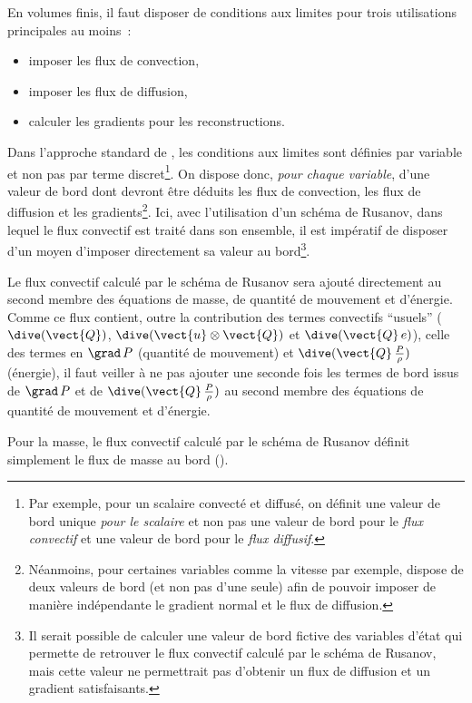 En volumes finis, il faut disposer de conditions aux
limites pour trois utilisations principales au moins~:
         \begin{itemize}
        \item imposer les flux de convection,
        \item imposer les flux de diffusion,
        \item calculer les gradients pour les reconstructions.
        \end{itemize}
Dans l'approche standard de \CS, les conditions aux limites sont d\'efinies par
variable et non pas par terme discret\footnote{Par exemple, pour un scalaire
convect\'e et diffus\'e, on d\'efinit une valeur de bord unique {\it pour le scalaire}
et non pas une valeur de bord pour le {\it flux convectif} et une valeur de bord
pour le {\it flux diffusif}.}. On dispose donc, {\it pour chaque variable},
d'une valeur de bord dont devront \^etre d\'eduits les flux de
convection, les flux de diffusion et les gradients\footnote{N\'eanmoins, pour
certaines variables comme la vitesse par exemple, \CS dispose de deux valeurs
de bord (et non pas d'une seule) afin de pouvoir imposer de mani\`ere
ind\'ependante le gradient normal et le flux de diffusion.}.
Ici, avec l'utilisation d'un sch\'ema de
Rusanov, dans lequel le flux convectif est trait\'e dans son ensemble,
il est imp\'eratif
de disposer d'un moyen d'imposer directement sa valeur au bord\footnote{Il
serait possible de calculer une valeur de bord fictive des variables d'\'etat qui
permette de retrouver le flux convectif calcul\'e par le sch\'ema de Rusanov,
mais cette valeur ne permettrait pas d'obtenir
un flux de diffusion et un gradient satisfaisants.}.

Le flux convectif calcul\'e par le sch\'ema de Rusanov
sera ajout\'e directement au second membre
des \'equations de masse, de quantit\'e de mouvement et d'\'energie. Comme ce
flux contient, outre la contribution des termes convectifs ``usuels''
($\dive(\vect{Q})$, $\dive(\vect{u}\otimes\vect{Q})$ et
$\dive(\vect{Q}\,e)$), celle des termes en $\grad\,P$ (quantit\'e de
mouvement) et $\dive(\vect{Q}\,\frac{P}{\rho})$
(\'energie), il faut veiller \`a ne pas
ajouter une seconde fois les termes de bord issus de  $\grad\,P$ et de
$\dive(\vect{Q}\,\frac{P}{\rho})$
au second membre des \'equations de quantit\'e de
mouvement et d'\'energie.


Pour la masse, le flux convectif calcul\'e par le sch\'ema de Rusanov
d\'efinit simplement le flux de masse au bord
().

